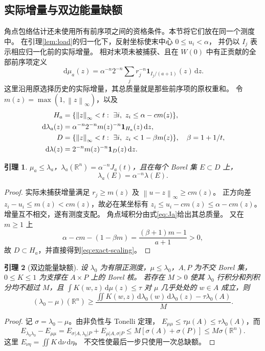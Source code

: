 \documentclass[UTF8,a4paper,11pt,fontset=fandol]{ctexart}
\newtheorem{lemma}{引理}[section]
\theoremstyle{remark}
\newcommand{\R}{\mathbb R}
\newcommand{\one}{\mathbf 1}
\newcommand{\norm}[1]{\left\lVert#1\right\rVert}
\newcommand{\dint}{\,\mathrm d}
\begin{document}
\subsection{实际增量与双边能量缺额}
角点包络估计还未使用所有前序项之间的资格条件。本节将它们放在同一个测度中。
在引理\ref{lem:load}的归一化下，反射坐标使末中心 $0\le u_i<\alpha$，
并仍以 $I_j$ 表示相应归一化前的实际增量。
相对末项未被捕获、且在 $W(0)$ 中有正贡献的全部前序项定义
\begin{equation}\label{eq:mu}
 \dint\mu_a(z)=\alpha^{-n}2^{-n}\sum_j r_j^{-n}
                 \one_{I_j/(a+1)}(z)\dint z.
\end{equation}
这里沿用原选择历史的实际增量，其总质量就是那些前序项的原权重和。
令 $m(z)=\max(1,\norm z_\infty)$，以及
\begin{align}
 H_a&=\{\norm z_\infty<t:\ \exists i,\ z_i\le\alpha-cm(z)\},\notag\\
 \dint\lambda_a(z)&=\alpha^{-n}2^{-n}m(z)^{-n}\one_{H_a}(z)\dint z,\label{eq:lambda-a}\\
 D&=\{\norm z_\infty<t:\ \exists i,\ z_i<1-\beta m(z)\},\quad \beta=1+1/t,\notag\\
 \dint\lambda(z)&=2^{-n}m(z)^{-n}\one_D(z)\dint z.\label{eq:lambda}
\end{align}
\begin{lemma}\label{lem:actual}
$\mu_a\le\lambda_a$，$\lambda_a(\R^n)=\alpha^{-n}J_a(t)$，且在每个 Borel 集 $E\subset D$ 上，
\begin{equation}\label{eq:exact-scaling}
 \lambda_a(E)=\alpha^{-n}\lambda(E).
\end{equation}
\end{lemma}
\begin{proof}
实际未捕获增量满足 $r_j\ge m(z)$ 及 $\norm{u-z}_\infty\ge cm(z)$。
正方向差 $z_i-u_i\le m(z)<cm(z)$，故必在某坐标有
$z_i\le u_i-cm(z)\le\alpha-cm(z)$。
增量互不相交，遂有测度支配。
角点域积分由式\eqref{eq:Ja}给出其总质量。
又在 $m\ge1$ 上
\[
 \alpha-cm-(1-\beta m)=\frac{(\beta+1)m-1}{a+1}>0,
\]
故 $D\subset H_a$，并直接得到\eqref{eq:exact-scaling}。
\end{proof}

\begin{lemma}[双边能量缺额]\label{lem:energy}
设 $\lambda_0$ 为有限正测度，$\mu\le\lambda_0$，$A,P$ 为不交 Borel 集，
$0\le K\le1$ 为支撑在 $A\times P$ 上的 Borel 核。
若存在 $M>0$ 使其 $\lambda_0$ 行积分和列积分均不超过 $M$，且
$\int K(w,z)\dint\mu(z)\le\tau$ 对 $\mu$ 几乎处处的 $w\in A$ 成立，则
\begin{equation}\label{eq:energy-deficit}
 (\lambda_0-\mu)(\R^n)\ge
 \frac{\iint K(w,z)\dint\lambda_0(w)\dint\lambda_0(z)-\tau\lambda_0(A)}{M}.
\end{equation}
\end{lemma}
\begin{proof}
记 $\sigma=\lambda_0-\mu$。由非负性与 Tonelli 定理，
$E_{\mu\mu}\le\tau\mu(A)\le\tau\lambda_0(A)$，而
\[
 E_{\lambda_0\lambda_0}-E_{\mu\mu}
 =E_{\sigma|A,\lambda_0|P}+E_{\mu|A,\sigma|P}
 \le M[\sigma(A)+\sigma(P)]\le M\sigma(\R^n).
\]
这里 $E_{\nu\eta}=\iint K\dint\nu\dint\eta$。
不交性使最后一步只使用一次总缺额。
\end{proof}
\end{document}
